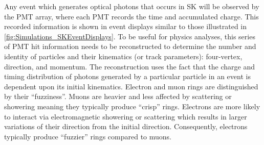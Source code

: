 Any event which generates optical photons that occurs in SK will be observed by the PMT array, where each PMT records the time and accumulated charge. This recorded information is shown in event displays similar to those illustrated in \autoref{fig:Simulations_SKEventDisplays}. To be useful for physics analyses, this series of PMT hit information needs to be reconstructed to determine the number and identity of particles and their kinematics (or track parameters): four-vertex, direction, and momentum. The reconstruction uses the fact that the charge and timing distribution of photons generated by a particular particle in an event is dependent upon its initial kinematics. Electron and muon rings are distinguished by their ``fuzziness''. Muons are heavier and less affected by scattering or showering meaning they typically produce ``crisp'' rings. Electrons are more likely to interact via electromagnetic showering or scattering which results in larger variations of their direction from the initial direction. Consequently, electrons typically produce ``fuzzier'' rings compared to muons. 

